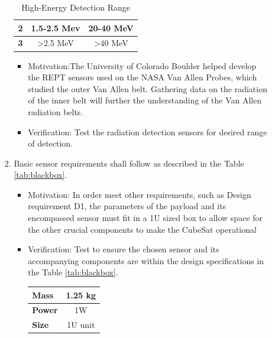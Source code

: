\begin{enumerate}
\begin{enumerate}
\begin{enumerate}
\begin{table}[H]
\begin{tabular}{|l|c|c|}
                        \textbf{2} & 1.5-2.5 Mev & 20-40 MeV
                        \\
                        \hline
                        \textbf{3} & >2.5 MeV & >40 MeV
                        \\
                        \hline
                        \end{tabular}
                        \caption{High-Energy Detection Range}
                        \label{tab:mev}
                        \end{table}
                            \begin{itemize}
                        \item Motivation:The University of Colorado Boulder helped develop the REPT sensors used on the NASA Van Allen Probes, which studied the outer Van Allen belt. Gathering data on the radiation of the inner belt will further the understanding of the Van Allen radiation belts. 
                        \item Verification: Test the radiation detection sensors for desired range of detection.
                    \end{itemize}
                    \item  Basic sensor requirements shall follow as described in the Table \ref{tab:blackbox}.
                        \begin{itemize}
                            \item Motivation: In order meet other requirements, such as Design requirement D1, the parameters of the payload and its encompassed sensor must fit in a 1U sized box to allow space for the other crucial components to make the CubeSat operational 
                            \item Verification: Test to ensure the chosen sensor and its accompanying components are within the design specifications in the Table \ref{tab:blackbox}.
                            \begin{table}[H]
                            \centering
                            \begin{tabular}{|l|c|} 
                            \hline
                            \textbf{Mass} & 1.25 kg
                            \\
                            \hline
                            \textbf{Power} & 1W 
                            \\
                            \hline
                            \textbf{Size} & 1U unit

\end{tabular}
\end{table}
\end{itemize}
\end{enumerate}
\end{enumerate}
\end{enumerate}

